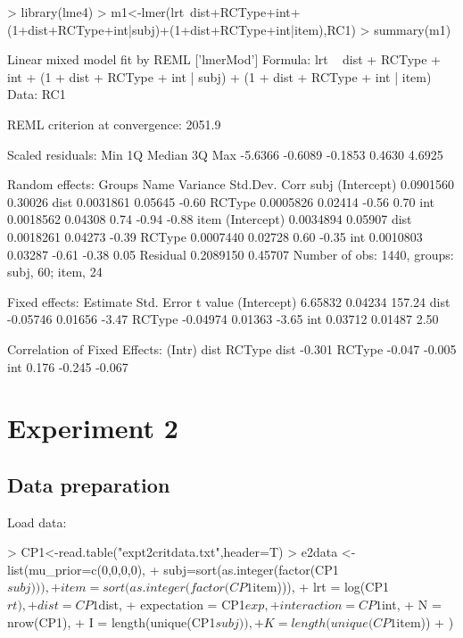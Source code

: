 \documentclass{article}
\begin{document}
\begin{Schunk}
\begin{Sinput}
> library(lme4)
> m1<-lmer(lrt~dist+RCType+int+(1+dist+RCType+int|subj)+(1+dist+RCType+int|item),RC1)
> summary(m1)
\end{Sinput}
\begin{Soutput}
Linear mixed model fit by REML ['lmerMod']
Formula: lrt ~ dist + RCType + int + (1 + dist + RCType + int | subj) +  
    (1 + dist + RCType + int | item)
   Data: RC1

REML criterion at convergence: 2051.9

Scaled residuals: 
    Min      1Q  Median      3Q     Max 
-5.6366 -0.6089 -0.1853  0.4630  4.6925 

Random effects:
 Groups   Name        Variance  Std.Dev. Corr             
 subj     (Intercept) 0.0901560 0.30026                   
          dist        0.0031861 0.05645  -0.60            
          RCType      0.0005826 0.02414  -0.56  0.70      
          int         0.0018562 0.04308   0.74 -0.94 -0.88
 item     (Intercept) 0.0034894 0.05907                   
          dist        0.0018261 0.04273  -0.39            
          RCType      0.0007440 0.02728   0.60 -0.35      
          int         0.0010803 0.03287  -0.61 -0.38  0.05
 Residual             0.2089150 0.45707                   
Number of obs: 1440, groups:  subj, 60; item, 24

Fixed effects:
            Estimate Std. Error t value
(Intercept)  6.65832    0.04234  157.24
dist        -0.05746    0.01656   -3.47
RCType      -0.04974    0.01363   -3.65
int          0.03712    0.01487    2.50

Correlation of Fixed Effects:
       (Intr) dist   RCType
dist   -0.301              
RCType -0.047 -0.005       
int     0.176 -0.245 -0.067
\end{Soutput}
\end{Schunk}

\section{Experiment 2}

\subsection{Data preparation}

Load data:

\begin{Schunk}
\begin{Sinput}
> CP1<-read.table("expt2critdata.txt",header=T)
> e2data <- list(mu_prior=c(0,0,0,0),
+                subj=sort(as.integer(factor(CP1$subj))),
+                item=sort(as.integer(factor(CP1$item))),
+                lrt = log(CP1$rt),
+                dist = CP1$dist,
+                expectation = CP1$exp,
+                interaction = CP1$int,
+                N = nrow(CP1),
+                I = length(unique(CP1$subj)),
+                K = length(unique(CP1$item))
+ )  
\end{Sinput}
\end{Schunk}
\end{document}
